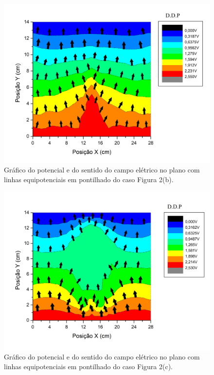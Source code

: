 \begin{figure}[ht!]
\centering
\includegraphics[width = 9 cm]{figuras/Graph4.png}
\caption{\small{Gráfico do potencial e do sentido do campo elétrico no plano com linhas equipotenciais em pontilhado do caso Figura 2(b).}}
\label{fig:3}
\end{figure}

\begin{figure}[ht!]
\centering
\includegraphics[width = 9 cm]{figuras/Graph1.png}
\caption{\small{Gráfico do potencial e do sentido do campo elétrico no plano com linhas equipotenciais em pontilhado do caso Figura 2(c).}}
\label{fig:4}
\end{figure}

